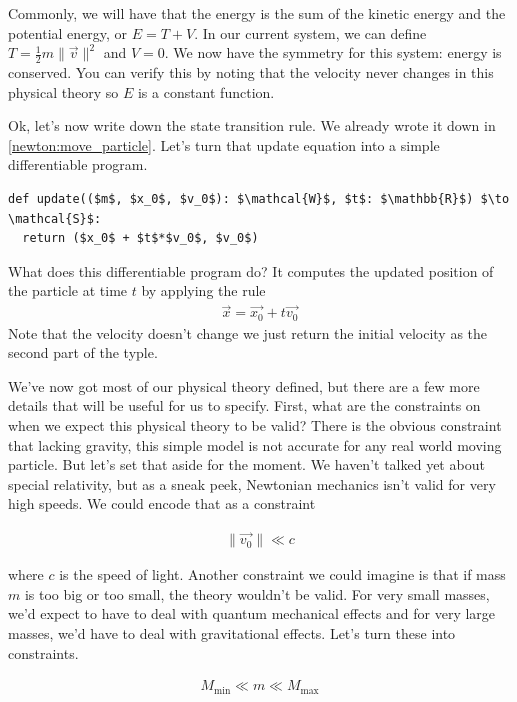 \documentclass[book.tex]{subfiles}
\begin{document}
Commonly, we will have that the energy is the sum of the kinetic energy and the potential energy, or $E = T + V$. In our current system, we can define $T = \tfrac{1}{2}m\|\vec{v}\|^2$ and $V = 0$. We now have the symmetry for this system: energy is conserved. You can verify this by noting that the velocity never changes in this physical theory so $E$ is a constant function.

Ok, let's now write down the state transition rule. We already wrote it down in \ref{newton:move_particle}. Let's turn that update equation into a simple differentiable program.

\begin{lstlisting}
def update(($m$, $x_0$, $v_0$): $\mathcal{W}$, $t$: $\mathbb{R}$) $\to \mathcal{S}$:
  return ($x_0$ + $t$*$v_0$, $v_0$)
\end{lstlisting}

What does this differentiable program do? It computes the updated position of the particle at time $t$ by applying the rule 
\begin{align}
\vec{x} = \vec{x_0} + t \vec{v_0}
\end{align}
Note that the velocity doesn't change we just return the initial velocity as the second part of the typle.

We've now got most of our physical theory defined, but there are a few more details that will be useful for us to specify. First, what are the constraints on when we expect this physical theory to be valid? There is the obvious constraint that lacking gravity, this simple model is not accurate for any real world moving particle. But let's set that aside for the moment. We haven't talked yet about special relativity, but as a sneak peek, Newtonian mechanics isn't valid for very high speeds. We could encode that as a constraint

\begin{align}
\|\vec{v_0}\| \ll c
\end{align}

\noindent where $c$ is the speed of light. Another constraint we could imagine is that if mass $m$ is too big or too small, the theory wouldn't be valid. For very small masses, we'd expect to have to deal with quantum mechanical effects and for very large masses, we'd have to deal with gravitational effects. Let's turn these into constraints.

\begin{align}
M_{\textrm{min}} \ll m \ll M_{\textrm{max}}
\end{align}
\end{document}

